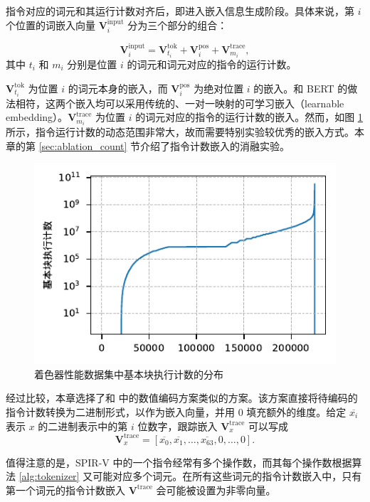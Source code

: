 {} 指令对应的词元和其运行计数对齐后，即进入嵌入信息生成阶段。具体来说，第 $ i $ 个位置的词嵌入向量 $ \mathbf{V}^{\text{input}}_i $ 分为三个部分的组合：

\begin{equation}
\mathbf{V}^{\text{input}}_i = \mathbf{V}^\text{tok}_{t_i} +\mathbf{V}^\text{pos}_i + \mathbf{V}^\text{trace}_{m_i},
\end{equation}
其中 $t_i$ 和 $m_i$ 分别是位置 $i$ 的词元和词元对应的指令的运行计数。

$ \mathbf{V}^\text{tok}_{t_i} $ 为位置 $i$ 的词元本身的嵌入，而 $\mathbf{V}^\text{pos}_i$ 为绝对位置 $ i $ 的嵌入。和 BERT 的做法相符，这两个嵌入{\amend 均可以采用传统的、}一对一映射的可学习嵌入（learnable embedding）。$ \mathbf{V}^\text{trace}_{m_i} $ 为位置 $i$ 的词元对应的指令的运行计数的嵌入。{\amend 然而，如图 \ref{fig:bb_distrib} 所示，指令运行计数的动态范围非常大，故而需要特别实验较优秀的嵌入方式。本章的第 \ref{sec:ablation_count} 节介绍了指令计数嵌入的消融实验。}

\begin{figure}[h]
    \centering
    \includegraphics[width=0.6\linewidth]{figures/RTX3060_Distribution_of_basic_block_trace_count.pdf}
    \caption{着色器性能数据集中基本块执行计数的分布}
    \label{fig:bb_distrib}
\end{figure}  

经过比较，本章选择了和 \citet{Born2023} 中的数值编码方案类似的方案。该方案直接将待编码的指令计数转换为二进制形式，以作为嵌入向量，并用 0 填充额外的维度。给定 $\overline{x_i}$ 表示 $x$ 的二进制表示中的第 $i$ 位数字，跟踪嵌入 $\mathbf{V}^{\text{trace}}_x$ 可以写成
\begin{equation}
\mathbf{V}^{\text{trace}}_x = [\overline{x_0}, \overline{x_1}, \dots, \overline{x_{63}}, 0, \dots, 0].
\end{equation}

值得注意的是，SPIR-V 中的一个指令经常有多个操作数，而其每个操作数根据算法 \ref{alg:tokenizer} 又可能对应多个词元。在所有这些词元的指令计数嵌入中，只有第一个词元的指令计数嵌入 $ \mathbf{V}^{\text{trace}} $ 会可能被设置为非零向量。

